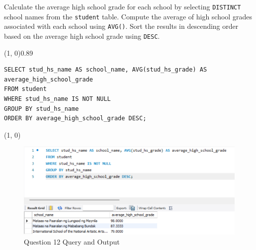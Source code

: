 
Calculate the average high school grade for each school by selecting \texttt{DISTINCT} school names from the \texttt{student} table. Compute the average of high school grades associated with each school using \texttt{AVG()}. Sort the results in descending order based on the average high school grade using \texttt{DESC}.
\vspace{\baselineskip}


\sol{}
\noindent\line(1, 0){0.89\linewidth}
\begin{verbatim}
SELECT stud_hs_name AS school_name, AVG(stud_hs_grade) AS average_high_school_grade
FROM student
WHERE stud_hs_name IS NOT NULL
GROUP BY stud_hs_name
ORDER BY average_high_school_grade DESC;
\end{verbatim}
\noindent\line(1, 0){\linewidth}

\begin{figure}[H]
    \centering
    \includegraphics[width=0.7\linewidth]{images/q12.png}
    \caption{Question 12 Query and Output}
\end{figure}
